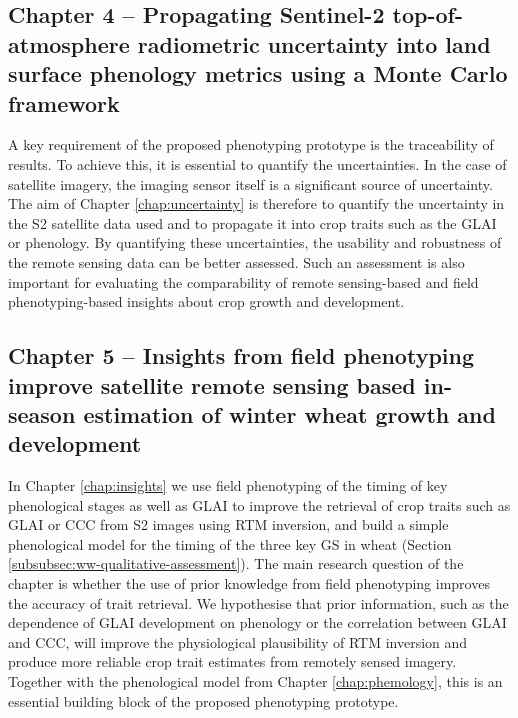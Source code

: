 \subsection*{Chapter 4 -- Propagating Sentinel-2 top-of-atmosphere radiometric uncertainty into land surface phenology metrics using a Monte Carlo framework}
A key requirement of the proposed phenotyping prototype is the traceability of results. To achieve this, it is essential to quantify the uncertainties. In the case of satellite imagery, the imaging sensor itself is a significant source of uncertainty. The aim of Chapter \ref{chap:uncertainty} is therefore to quantify the uncertainty in the \gls{S2} satellite data used and to propagate it into crop traits such as the \gls{GLAI} or phenology. By quantifying these uncertainties, the usability and robustness of the remote sensing data can be better assessed. Such an assessment is also important for evaluating the comparability of remote sensing-based and field phenotyping-based insights about crop growth and development.

\subsection*{Chapter 5 -- Insights from field phenotyping improve satellite remote sensing based in-season estimation of winter wheat growth and development}
In Chapter \ref{chap:insights} we use field phenotyping of the timing of key phenological stages as well as \gls{GLAI} to improve the retrieval of crop traits such as \gls{GLAI} or \gls{CCC} from \gls{S2} images using \gls{RTM} inversion, and build a simple phenological model for the timing of the three key \gls{GS} in wheat (Section \ref{subsubsec:ww-qualitative-assessment}). The main research question of the chapter is whether the use of prior knowledge from field phenotyping improves the accuracy of trait retrieval. We hypothesise that prior information, such as the dependence of \gls{GLAI} development on phenology or the correlation between \gls{GLAI} and \gls{CCC}, will improve the physiological plausibility of \gls{RTM} inversion and produce more reliable crop trait estimates from remotely sensed imagery. Together with the phenological model from Chapter \ref{chap:phemology}, this is an essential building block of the proposed phenotyping prototype.

